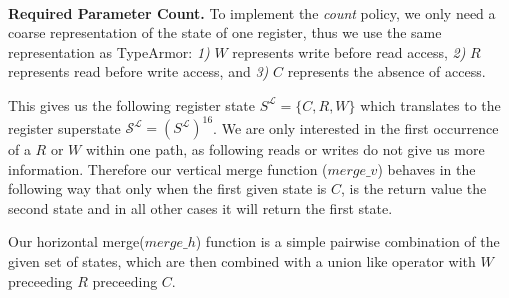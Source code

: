 ~\\
\textbf{Required Parameter Count.}
\label{subsection:requiredparamcount}
To implement the \emph{count} policy, we only need a coarse representation of the state of one register, thus we use the same representation as TypeArmor:
\textit{1)} $W$ represents write before read access,
\textit{2)} $R$ represents read before write access, and
\textit{3)} $C$ represents the absence of access.

This gives us the following register state $S^\mathcal{L} = \{ C, R, W \}$ which translates to the register superstate $\mathcal{S}^\mathcal{L} = (S^\mathcal{L})^{16}$.
We are only interested in the first occurrence of a $R$ or $W$ within one path, as following reads or writes do not give us more information. 
Therefore our vertical merge function ($merge\_v$) behaves in the following way that only when the first given state is $C$, 
is the return value the second state and in all other cases it will return the first state.


Our horizontal merge($merge\_h$) function is a simple pairwise combination of the given set of states, 
which are then combined with a union like operator with $W$ preceeding $R$ preceeding $C$.

%


